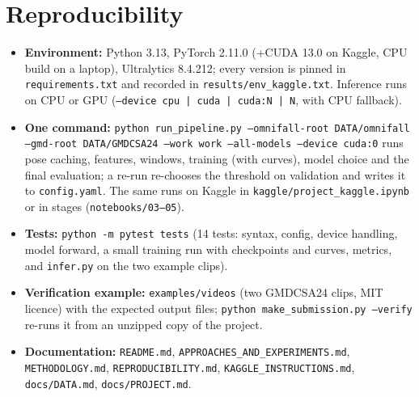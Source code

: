 \documentclass[11pt,a4paper]{article}
\newcommand{\code}[1]{\texttt{\small #1}}
\begin{document}
\section{Reproducibility}
\begin{itemize}
\item \textbf{Environment:} Python 3.13, PyTorch 2.11.0 (+CUDA 13.0 on Kaggle, CPU build on a laptop),
Ultralytics 8.4.212; every version is pinned in \code{requirements.txt} and recorded in
\code{results/env\_kaggle.txt}. Inference runs on CPU or GPU (\code{--device cpu | cuda | cuda:N | N}, with CPU
fallback).
\item \textbf{One command:} \code{python run\_pipeline.py --omnifall-root DATA/omnifall --gmd-root DATA/GMDCSA24
--work work --all-models --device cuda:0} runs pose caching, features, windows, training (with curves), model
choice and the final evaluation; a re-run re-chooses the threshold on validation and writes it to
\code{config.yaml}. The same runs on Kaggle in \code{kaggle/project\_kaggle.ipynb} or in stages
(\code{notebooks/03--05}).
\item \textbf{Tests:} \code{python -m pytest tests} (14 tests: syntax, config, device handling, model
forward, a small training run with checkpoints and curves, metrics, and \code{infer.py} on the two example clips).
\item \textbf{Verification example:} \code{examples/videos} (two GMDCSA24 clips, MIT licence) with the
expected output files; \code{python make\_submission.py --verify} re-runs it from an unzipped copy of the project.
\item \textbf{Documentation:} \code{README.md}, \code{APPROACHES\_AND\_EXPERIMENTS.md}, \code{METHODOLOGY.md},
\code{REPRODUCIBILITY.md}, \code{KAGGLE\_INSTRUCTIONS.md}, \code{docs/DATA.md}, \code{docs/PROJECT.md}.
\end{itemize}
\end{document}
